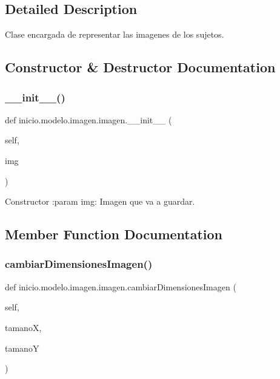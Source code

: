 \subsection{Detailed Description}
\begin{DoxyVerb}Clase encargada de representar las imagenes de los sujetos.
\end{DoxyVerb}
 

\subsection{Constructor \& Destructor Documentation}
\mbox{\label{classinicio_1_1modelo_1_1imagen_1_1imagen_a2ba53c2f7cb5f3cb1cc942b9929c0caf}} 
\subsubsection{\texorpdfstring{\+\_\+\+\_\+init\+\_\+\+\_\+()}{\_\_init\_\_()}}
{\footnotesize\ttfamily def inicio.\+modelo.\+imagen.\+imagen.\+\_\+\+\_\+init\+\_\+\+\_\+ (\begin{DoxyParamCaption}\item[{}]{self,  }\item[{}]{img }\end{DoxyParamCaption})}

\begin{DoxyVerb}Constructor
:param img: Imagen que va a guardar.
\end{DoxyVerb}
 

\subsection{Member Function Documentation}
\mbox{\label{classinicio_1_1modelo_1_1imagen_1_1imagen_a8e7da80b8ae76219a82e8f4424d769a0}} 
\subsubsection{\texorpdfstring{cambiar\+Dimensiones\+Imagen()}{cambiarDimensionesImagen()}}
{\footnotesize\ttfamily def inicio.\+modelo.\+imagen.\+imagen.\+cambiar\+Dimensiones\+Imagen (\begin{DoxyParamCaption}\item[{}]{self,  }\item[{}]{tamanoX,  }\item[{}]{tamanoY }\end{DoxyParamCaption})}

